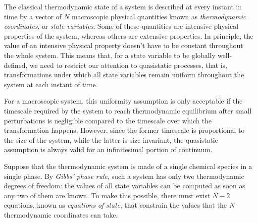 The classical thermodynamic state of a system is described
at every instant in time by a vector of $N$ macroscopic
physical quantities known as \emph{thermodynamic coordinates},
or \emph{state variables}.
Some of these quantities are intensive physical properties of the system,
whereas others are extensive properties.
In principle, the value of an intensive physical property doesn't have to
be constant throughout the whole system. This means that,
for a state variable to be globally well-defined, we need to restrict
our attention to quasistatic processes, that is, transformations
under which all state variables remain uniform throughout
the system at each instant of time.

For a macroscopic system, this uniformity assumption is only acceptable
if the timescale required by the system to reach thermodynamic equilibrium
after small perturbations is negligible compared to the timescale over which
the transformation happens. However, since the former timescale is proportional
to the size of the system, while the latter is size-invariant, the quasistatic
assumption is always valid for an infinitesimal portion of continuum.

Suppose that the thermodynamic system is made of a single chemical species
in a single phase. By \emph{Gibbs' phase rule}, such a system has only
two thermodynamic degrees of freedom: the values of all state variables
can be computed as soon as any two of them are known. To make this possible,
there must exist $N-2$ equations, known as \emph{equations of state},
that constrain the values that the $N$ thermodynamic coordinates can take.

